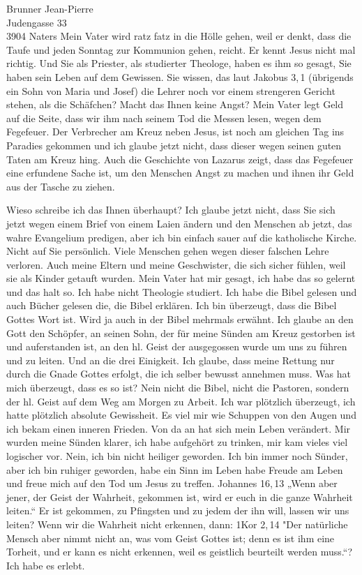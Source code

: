 \documentclass[
    12pt,
    a4paper,
    letter,
    parskip=yes,
    ]{scrlttr2}
\begin{document}
\begin{letter}{
Brunner Jean-Pierre\\
Judengasse 33\\
3904 Naters}
Mein Vater wird ratz fatz in die Hölle gehen, weil er denkt, dass die Taufe und jeden Sonntag zur Kommunion gehen, reicht. Er kennt Jesus nicht mal richtig. Und Sie als Priester, als studierter Theologe, haben es ihm so gesagt, Sie haben sein Leben auf dem Gewissen. Sie wissen, das laut Jakobus 3,\,1 (übrigends ein Sohn von Maria und Josef) die Lehrer noch vor einem strengeren Gericht stehen, als die Schäfchen? Macht das Ihnen keine Angst? Mein Vater legt Geld auf die Seite, dass wir ihm nach seinem Tod die Messen lesen, wegen dem Fegefeuer. Der Verbrecher am Kreuz neben Jesus, ist noch am gleichen Tag ins Paradies gekommen und ich glaube jetzt nicht, dass dieser wegen seinen guten Taten am Kreuz hing. Auch die Geschichte von Lazarus zeigt, dass das Fegefeuer eine erfundene Sache ist, um den Menschen Angst zu machen und ihnen ihr Geld aus der Tasche zu ziehen. 

Wieso schreibe ich das Ihnen überhaupt? Ich glaube jetzt nicht, dass Sie sich jetzt wegen einem Brief von einem Laien ändern und den Menschen ab jetzt, das wahre Evangelium predigen, aber ich bin einfach sauer auf die katholische Kirche. Nicht auf Sie persönlich. Viele Menschen gehen wegen dieser falschen Lehre verloren. Auch meine Eltern und meine Geschwister, die sich sicher fühlen, weil sie als Kinder getauft wurden. Mein Vater hat mir gesagt, ich habe das so gelernt und das halt so. Ich habe nicht Theologie studiert. Ich habe die Bibel gelesen und auch Bücher gelesen die, die Bibel erklären. Ich bin überzeugt, dass die Bibel Gottes Wort ist. Wird ja auch in der Bibel mehrmals erwähnt. Ich glaube an den Gott den Schöpfer, an seinen Sohn, der für meine Sünden am Kreuz gestorben ist und auferstanden ist, an den hl. Geist der ausgegossen wurde um uns zu führen und zu leiten. Und an die drei Einigkeit. Ich glaube, dass meine Rettung nur durch die Gnade Gottes erfolgt, die ich selber bewusst annehmen muss. Was hat mich überzeugt, dass es so ist? Nein nicht die Bibel, nicht die Pastoren, sondern der hl. Geist auf dem Weg am Morgen zu Arbeit. Ich war plötzlich überzeugt, ich hatte plötzlich absolute Gewissheit. Es viel mir wie Schuppen von den Augen und ich bekam einen inneren Frieden. Von da an hat sich mein Leben verändert. Mir wurden meine Sünden klarer, ich habe aufgehört zu trinken, mir kam vieles viel logischer vor. Nein, ich bin nicht heiliger geworden. Ich bin immer noch Sünder, aber ich bin ruhiger geworden, habe ein Sinn im Leben habe Freude am Leben und freue mich auf den Tod um Jesus zu treffen. Johannes 16,\,13 „Wenn aber jener, der Geist der Wahrheit, gekommen ist, wird er euch in die ganze Wahrheit leiten.“ Er ist gekommen, zu Pfingsten und zu jedem der ihn will, lassen wir uns leiten? Wenn wir die Wahrheit nicht erkennen, dann: 1Kor 2,\,14 "Der natürliche Mensch aber nimmt nicht an, was vom Geist Gottes ist; denn es ist ihm eine Torheit, und er kann es nicht erkennen, weil es geistlich beurteilt werden muss.“? Ich habe es erlebt. 


\end{letter}
\end{document}
